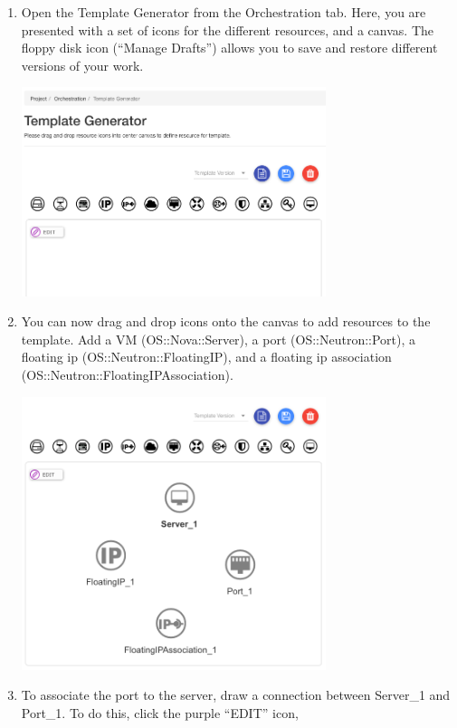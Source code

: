 \begin{enumerate}
\item Open the Template Generator from the Orchestration tab.  Here,
  you are presented with a set of icons for the different resources,
  and a canvas.  The floppy disk icon (``Manage Drafts'') allows you
  to save and restore different versions of your work.
  \begin{center}
    \includegraphics[width=0.7\textwidth]{img/template_generator}
  \end{center}
\item You can now drag and drop icons onto the canvas to add resources
  to the template.  Add a VM (OS::Nova::Server), a port
  (OS::Neutron::Port), a floating ip (OS::Neutron::FloatingIP), and a
  floating ip association (OS::Neutron::FloatingIPAssociation).
  \begin{center}
    \includegraphics[width=0.7\textwidth]{img/all_resources}
  \end{center}
\item To associate the port to the server, draw a connection between
  Server\_1 and Port\_1.  To do this, click the purple ``EDIT'' icon,

\end{enumerate}
